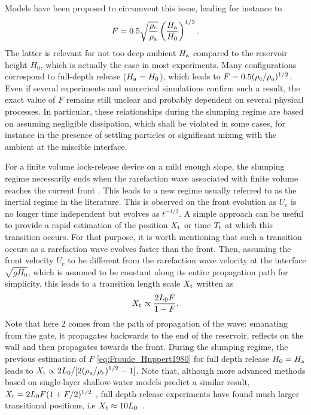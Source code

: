 \documentclass[12pt]{article}
\begin{document}
Models have been proposed to circumvent this issue, leading for instance to \citep{Huppert1980}
\begin{equation}
	\label{eq:Froude_Huppert1980}
	F = 0.5 \sqrt{\frac{\rho_{\text c}}{\rho_{\text a}}}\left(\frac{H_{\text a}}{H_0}\right)^{1/3}.
\end{equation}
%
The latter is relevant for not too deep ambient $H_{\text a}$ compared to the reservoir height $H_0$, which is actually the case in most experiments. Many configurations correspond to full-depth release ($H_{\text a}=H_0$), which leads to $F = 0.5(\rho_{\text c}/\rho_{\text a})^{1/2}$. Even if several experiments and numerical simulations confirm such a result, the exact value of $F$ remains still unclear and probably dependent on several physical processes. In particular, these relationships during the slumping regime are based on assuming negligible dissipation, which shall be violated in some cases, for instance in the presence of settling particles or significant mixing with the ambient at the miscible interface.

For a finite volume lock-release device on a mild enough slope, the slumping regime necessarily ends when the rarefaction wave associated with finite volume reaches the current front \citep[e.g.][]{Rottman1983, Hogg2006}. This leads to a new regime usually referred to as the inertial regime in the literature. This is observed on the front evolution as $U_{\text{c}}$ is no longer time independent but evolves as $t^{-1/3}$.
A simple approach can be useful to provide a rapid estimation of the position $X_{\text t}$ or time $T_{\text t}$ at which this transition occurs. For that purpose, it is worth mentioning that such a transition occurs as a rarefaction wave evolves faster than the front. Then, assuming the front velocity $U_{\text{c}}$ to be different from the rarefaction wave velocity at the interface $\sqrt{\tilde{g}H_0}$, which is assumed to be constant along its entire propagation path for simplicity, this leads to a transition length scale $X_{\text t}$ written as
\begin{equation}
	\label{eq:Xt_inertial}
	\displaystyle X_{\text t}\propto  \frac{2L_0 F}{1 - F}.
\end{equation}
Note that here $2$ comes from the path of propagation of the wave: emanating from the gate, it propagates backwards to the end of the reservoir, reflects on the wall and then propagates towards the front.
During the slumping regime, the previous estimation of $F$ \eqref{eq:Froude_Huppert1980} for full depth release $H_0=H_{\text a}$ leads to $X_{\text t}\propto 2L_0/[2(\rho_{\text a}/\rho_{\text c})^{1/2}-1]$. Note that, although more advanced methods based on single-layer shallow-water models predict a similar result, $X_{\text t} = 2 L_0 F (1 + F/2)^{1/2}$ \citep{Hogg2006}, full depth-release experiments have found much larger transitional positions, i.e $X_{\text t} \approx 10 L_{0}$~\citep{Rottman1983}.
\end{document}
